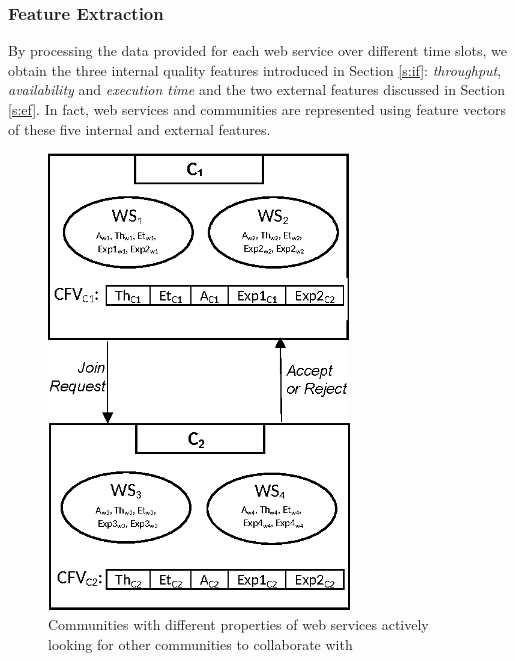 \documentclass[11pt,onecolumn]{IEEEtran}
\begin{document}
\subsubsection{Feature Extraction}\label{sss:filtereddata}

By processing the data provided for each web service over different time slots, we obtain the three internal quality features introduced in Section \ref{s:if}: \emph{throughput}, \emph{availability} and \emph{execution time} and the two external features discussed in Section \ref{s:ef}.  In fact, web services and communities are represented using feature vectors of these five internal and external features. 


\begin{figure}%
\centerline{\includegraphics[width=3.15in]{figures/cfvs.eps}}
\caption{Communities with different properties of web services actively looking for other communities to collaborate with}
\label{fig_community}
\end{figure}

\end{document}
